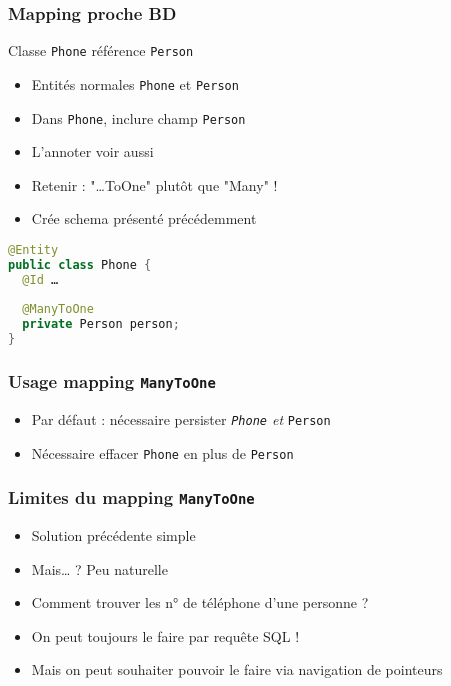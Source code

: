 \documentclass[english, french]{beamer}
\begin{document}
\begin{frame}[fragile]
	\frametitle{Mapping proche BD}
	Classe \texttt{Phone} référence \texttt{Person}
	\begin{itemize}
		\item Entités normales \texttt{Phone} et \texttt{Person}
		\item Dans \texttt{Phone}, inclure champ \texttt{Person}
		\item L’annoter  {\tiny voir aussi }
		\item Retenir : "…ToOne" plutôt que "Many" !
		 \item Crée schema présenté précédemment
	\end{itemize}
	\begin{lstlisting}[language=Java]
@Entity
public class Phone {
  @Id …
  
  @ManyToOne
  private Person person;
}
	\end{lstlisting}
\end{frame}

\begin{frame}
	\frametitle{Usage mapping \texttt{ManyToOne}}
	\begin{itemize}
		 \item Par défaut : nécessaire persister \emph{\texttt{Phone} et} \texttt{Person}
		 \item Nécessaire effacer \texttt{Phone} en plus de \texttt{Person}
	\end{itemize}
	\begin{block}{}
		
	\end{block}
\end{frame}

\begin{frame}
	\frametitle{Limites du mapping \texttt{ManyToOne}}
	\begin{itemize}
		\item Solution précédente simple
		\item Mais… ? \pause Peu naturelle \pause
		\item Comment trouver les n° de téléphone d’une personne ? \pause
		\item On peut toujours le faire par requête SQL !
		\item Mais on peut souhaiter pouvoir le faire via navigation de pointeurs
	\end{itemize}
	\begin{block}{}
		
	\end{block}
\end{frame}
\end{document}
